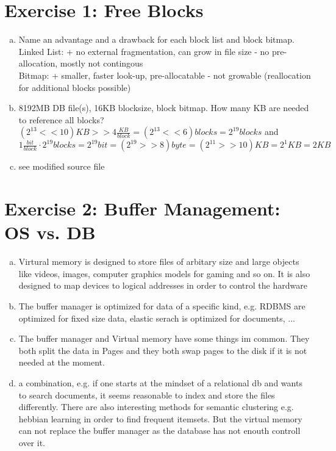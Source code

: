 \documentclass[a4paper]{article}
\begin{document}
	\section*{Exercise 1: Free Blocks}\label{sec:exercise1}
   \begin{enumerate}[a.]
		\item Name an advantage and a drawback for each block list
            and block bitmap. \\
            Linked List: + no external fragmentation, can grow in file 
            size - no pre-allocation, mostly not contingous \\
            Bitmap: + smaller, faster look-up, pre-allocatable 
            - not growable (reallocation for additional blocks possible)\\
        \item 8192MB DB file(s), 16KB blocksize, block bitmap. How 
            many KB are needed to reference all blocks? \\
            $(2^{13} << 10 )KB >> 4 \frac{KB}{block} = (2^{13} << 6) 
            blocks = 2^{19} blocks$  and \\
            $ 1 \frac{bit}{block} \cdot 2^{19} blocks = 2^{19} bit
            = (2^{19} >> 8) byte = (2^{11} >> 10) KB = 2^{1} KB = 2 KB$ \\
        \item see modified source file
   \end{enumerate}

	\section*{Exercise 2: Buffer Management: OS vs. DB}\label{sec:exercise2}
        \begin{enumerate}[a.]
            \item Virtural memory is designed to store files of arbitary size and large objects like videos, images, computer graphics models for gaming and so on. It is also designed to map devices to logical addresses in order to control the hardware
            \item The buffer manager is optimized for data of a specific kind, e.g. RDBMS are optimized for fixed size data, elastic serach is optimized for documents, ...
            \item The buffer manager and Virtual memory have some things im common. They both split the data in Pages and they both swap pages to the disk if it is not needed at the moment. 
	    \item a combination, e.g. if one starts at the mindset of a relational db and wants to search documents, it seems reasonable to index and store the files differently. There are also interesting methods for semantic clustering e.g. hebbian learning in order to find frequent itemsets. But the virtual memory can not replace the buffer manager as the database has not enouth controll over it.
        \end{enumerate}
\end{document}
